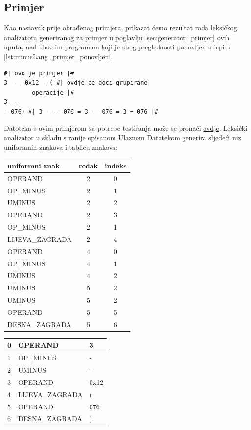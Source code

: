 \documentclass[times, 12pt, utf8]{book}
\begin{document}
\subsection{Primjer}\label{sec:leksicki_analizator_primjer}
Kao nastavak prije obrađenog primjera, prikazat ćemo rezultat rada leksičkog analizatora generiranog za primjer u poglavlju \ref{sec:generator_primjer} ovih uputa, nad ulaznim programom koji je zbog preglednosti ponovljen u ispisu \ref{lst:minusLang_primjer_ponovljen}.

\begin{lstlisting}[caption={Primjer programa pisanog u jeziku \emph{minusLang}.},label=lst:minusLang_primjer_ponovljen]
#| ovo je primjer |#
3 -  -0x12 - ( #| ovdje ce doci grupirane
		operacije |#
3- -
--076) #| 3 - ---076 = 3 - -076 = 3 + 076 |#

\end{lstlisting}

Datoteka s ovim primjerom za potrebe testiranja može se pronaći \href{https://github.com/fer-ppj/ppj-labosi/raw/master/res/lab1/primjer.minus}{ovdje}.
Leksički analizator u skladu s ranije opisanom Ulaznom Datotekom generira sljedeći niz uniformnih znakova i tablicu znakova:

\begin{table}[ht]
\begin{minipage}[b]{0.5\linewidth}
\centering
\begin{tabular}{|l|c|c|}
\hline
uniformni znak&redak&indeks\\
\hline
OPERAND&2&0\\
\hline
OP\_MINUS&2&1\\
\hline
UMINUS&2&2\\
\hline
OPERAND&2&3\\
\hline
OP\_MINUS&2&1\\
\hline
LIJEVA\_ZAGRADA&2&4\\
\hline
OPERAND&4&0\\
\hline
OP\_MINUS&4&1\\
\hline
UMINUS&4&2\\
\hline
UMINUS&5&2\\
\hline
UMINUS&5&2\\
\hline
OPERAND&5&5\\
\hline
DESNA\_ZAGRADA&5&6\\
\hline
\end{tabular}
\end{minipage}
\hspace{0.5cm}
\begin{minipage}[b]{0.5\linewidth}
\centering
\begin{tabular}{|l|l|l|}
\hline
0&OPERAND&3\\
\hline
1&OP\_MINUS&-\\
\hline
2&UMINUS&-\\
\hline
3&OPERAND&0x12\\
\hline
4&LIJEVA\_ZAGRADA&(\\
\hline
5&OPERAND&076\\
\hline
6&DESNA\_ZAGRADA&)\\
\hline
\end{tabular}
\end{minipage}
\end{table}
\end{document}
